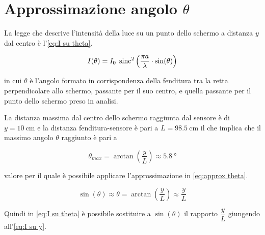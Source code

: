 \documentclass[../main.tex]{subfiles}
\begin{document}
\section{Approssimazione angolo $\theta$} \label{sec:approssimazione theta}

La legge che descrive l'intensità della luce su un punto dello schermo a distanza $y$ dal centro è l'\autoref{eq:I su theta}.

\begin{equation} \label{eq:I su theta}
    I(\theta) = I_{0} \; \operatorname{sinc}^{2} \left( \frac{\pi a}{\lambda} \cdot \sin(\theta)  \right)
\end{equation}

in cui $\theta$ è l'angolo formato in corrispondenza della fenditura tra la retta perpendicolare allo schermo, passante per il suo centro, e quella passante per il punto dello schermo preso in analisi.

La distanza massima dal centro dello schermo raggiunta dal sensore è di $y = \qty{10}{\cm}$ e la distanza fenditura-sensore è pari a $L = \qty{98.5}{\cm}$ il che implica che il massimo angolo $\theta$ raggiunto è pari a 

\begin{equation*}
    \theta_{max} = \arctan\left( \frac{y}{L} \right) \approx \qty{5.8}{\degree}
\end{equation*}

valore per il quale è possibile applicare l'approssimazione in \autoref{eq:approx theta}.

\begin{equation} \label{eq:approx theta}
    \sin(\theta) \approx \theta = \arctan\left( \frac{y}{L} \right) \approx \frac{y}{L} 
\end{equation}

Quindi in \autoref{eq:I su theta} è possibile sostituire a $\sin(\theta)$ il rapporto $\dfrac{y}{L}$ giungendo all'\autoref{eq:I su y}.
\end{document}
